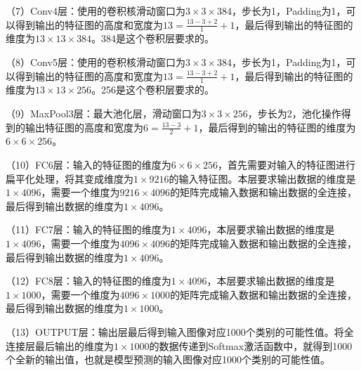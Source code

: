 \documentclass[12pt,a4paper,openany]{book}
\begin{document}
（7）Conv4层：使用的卷积核滑动窗口为$3 \times 3 \times 384$，步长为1，Padding为1，可以得到输出的特征图的高度和宽度为$13 = \frac{13 - 3 + 2}{1} + 1$，最后得到输出的特征图的维度为$13 \times 13 \times 384$。384是这个卷积层要求的。

（8）Conv5层：使用的卷积核滑动窗口为$3 \times 3 \times 384$，步长为1，Padding为1，可以得到输出的特征图的高度和宽度为$13 = \frac{13 - 3 + 2}{1} + 1$，最后得到输出的特征图的维度为$13 \times 13 \times 256$。256是这个卷积层要求的。

（9）MaxPool3层：最大池化层，滑动窗口为$3 \times 3 \times 256$，步长为2，池化操作得到的输出特征图的高度和宽度为$6 = \frac{13 - 3}{2} + 1$，最后得到的输出的特征图的维度为$6 \times 6 \times 256$。

（10）FC6层：输入的特征图的维度为$6 \times 6 \times 256$，首先需要对输入的特征图进行扁平化处理，将其变成维度为$1 \times 9216$的输入特征图。本层要求输出数据的维度是$1 \times 4096$，需要一个维度为$9216 \times 4096$的矩阵完成输入数据和输出数据的全连接，最后得到输出数据的维度为$1 \times 4096$。

（11）FC7层：输入的特征图的维度为$1 \times 4096$，本层要求输出数据的维度是$1 \times 4096$，需要一个维度为$4096 \times 4096$的矩阵完成输入数据和输出数据的全连接，最后得到输出数据的维度为$1 \times 4096$。

（12）FC8层：输入的特征图的维度为$1 \times 4096$，本层要求输出数据的维度是$1 \times 1000$，需要一个维度为$4096 \times 1000$的矩阵完成输入数据和输出数据的全连接，最后得到输出数据的维度为$1 \times 1000$。

（13）OUTPUT层：输出层最后得到输入图像对应1000个类别的可能性值。将全连接层最后输出的维度为$1 \times 1000$的数据传递到Softmax激活函数中，就得到1000个全新的输出值，也就是模型预测的输入图像对应1000个类别的可能性值。
\end{document}
